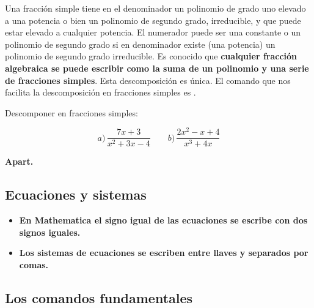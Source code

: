 \documentclass[a4paper,10pt, draft]{article}
\newcommand{\com}[1]{\textbf{\color{blue}{#1}}}
\newenvironment{capitulo}{\begin{tcolorbox}[colback=red!5!white,colframe=red!75!black]}{\end{tcolorbox}\bigskip}
\newenvironment{ejer}{\begin{tcolorbox}[center title, title=Ejercicios,
fonttitle=\sffamily\bfseries,colback=blue!5,colframe=orange]}{\end{tcolorbox}}
\newenvironment{funciones}{\begin{tcolorbox}[center title, title=Nuevas funciones, fonttitle=\sffamily\bfseries, colback=green!5!white,colframe=red!75!black]}{\end{tcolorbox}\bigskip}
\begin{document}
Una fracción simple tiene en el denominador un polinomio de grado uno elevado a una potencia o bien un polinomio de segundo grado, irreducible, y que puede estar elevado a cualquier potencia. El numerador puede ser una constante o un polinomio de segundo grado si en denominador existe (una potencia) un  polinomio 
de segundo grado irreducible. Es conocido que \textbf{cualquier fracción algebraica se puede escribir como la suma de un polinomio y una serie de fracciones simples}. Esta descomposición es única. El comando que nos facilita la descomposición en fracciones simples es \com{Apart[p]}.

\begin{ejer}

Descomponer en fracciones simples:

$$
a)\, \frac{7x+3}{x^2+3x-4} \qquad b)\, \frac{2x^2-x+4}{x^3+4x}
$$


\end{ejer} 


\begin{funciones}

\textbf{Apart.}

\end{funciones}


\newpage


\begin{capitulo}

\section{Ecuaciones y sistemas}


\end{capitulo}

\begin{itemize}

\item \textbf{En Mathematica el signo igual de las ecuaciones se escribe con dos signos iguales.}

\item \textbf{Los sistemas de ecuaciones se escriben entre llaves y separados por comas.}



\end{itemize}



\newpage

\subsection{Los comandos   fundamentales}
\end{document}
